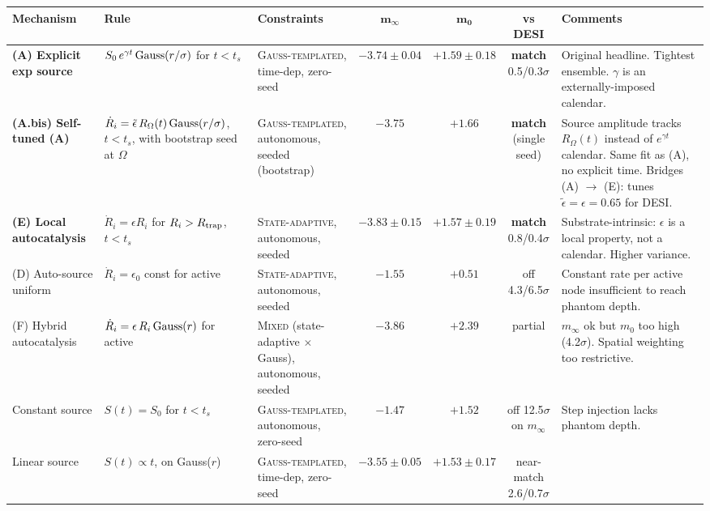 \documentclass[11pt,a4paper]{article}
\begin{document}
\begin{table}[!htbp]
\centering
\scriptsize
\setlength{\tabcolsep}{3pt}
\begin{tabular}{p{2.2cm}p{3.0cm}p{2.4cm}cccp{3.0cm}}
\toprule
\textbf{Mechanism} & \textbf{Rule} & \textbf{Constraints} & $\bm{m_\infty}$ & $\bm{m_0}$ & \textbf{vs DESI} & \textbf{Comments} \\
\midrule
\textbf{(A) Explicit exp source} &
$S_0\, e^{\gamma t}\, {\rm Gauss}(r/\sigma)$ for $t<t_s$ &
\textsc{Gauss-templated}, time-dep, zero-seed &
$-3.74 \pm 0.04$ & $+1.59 \pm 0.18$ & \textbf{match} 0.5/0.3$\sigma$ &
Original headline. Tightest ensemble. $\gamma$ is an externally-imposed calendar. \\
\addlinespace
\textbf{(A.bis) Self-tuned (A)} &
$\dot R_i = \tilde\epsilon\, R_\Omega(t)\,{\rm Gauss}(r/\sigma)$, $t<t_s$, with bootstrap seed at $\Omega$ &
\textsc{Gauss-templated}, autonomous, seeded (bootstrap) &
$-3.75$ & $+1.66$ & \textbf{match} (single seed) &
Source amplitude tracks $R_\Omega(t)$ instead of $e^{\gamma t}$ calendar. Same fit as (A), no explicit time. Bridges (A) $\to$ (E): tunes $\tilde\epsilon = \epsilon = 0.65$ for DESI. \\
\addlinespace
\textbf{(E) Local autocatalysis} &
$\dot R_i = \epsilon R_i$ for $R_i > R_{\rm trap}$, $t<t_s$ &
\textsc{State-adaptive}, autonomous, seeded &
$-3.83 \pm 0.15$ & $+1.57 \pm 0.19$ & \textbf{match} 0.8/0.4$\sigma$ &
Substrate-intrinsic: $\epsilon$ is a local property, not a calendar. Higher variance. \\
\addlinespace
(D) Auto-source uniform &
$\dot R_i = \epsilon_0$ const for active &
\textsc{State-adaptive}, autonomous, seeded &
$-1.55$ & $+0.51$ & off 4.3/6.5$\sigma$ &
Constant rate per active node insufficient to reach phantom depth. \\
\addlinespace
(F) Hybrid autocatalysis &
$\dot R_i = \epsilon\, R_i\,{\rm Gauss}(r)$ for active &
\textsc{Mixed} (state-adaptive $\times$ Gauss), autonomous, seeded &
$-3.86$ & $+2.39$ & partial &
$m_\infty$ ok but $m_0$ too high (4.2$\sigma$). Spatial weighting too restrictive. \\
\addlinespace
Constant source &
$S(t) = S_0$ for $t < t_s$ &
\textsc{Gauss-templated}, autonomous, zero-seed &
$-1.47$ & $+1.52$ & off 12.5$\sigma$ on $m_\infty$ &
Step injection lacks phantom depth. \\
\addlinespace
Linear source &
$S(t) \propto t$, on Gauss($r$) &
\textsc{Gauss-templated}, time-dep, zero-seed &
$-3.55 \pm 0.05$ & $+1.53 \pm 0.17$ & near-match 2.6/0.7$\sigma$ &

\end{tabular}
\end{table}
\end{document}

